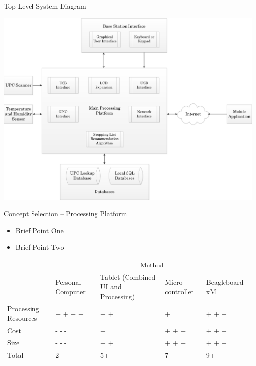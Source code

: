 \documentclass{beamer}
\begin{document}
\begin{frame}{Top Level System Diagram}
\begin{center}
\includegraphics[scale=.3]{../Graphics/FullSystemDiagram}
\end{center}
\end{frame}

\begin{frame}{Concept Selection -- Processing Platform}
\begin{itemize}
\item Brief Point One
\item Brief Point Two
\end{itemize}
\vspace{.5cm}
\footnotesize
\begin{tabular}{| p{.7in} | p{.7in} | p{1in} | p{0.7in} | p{.8in} | }
\cline{2-5}
\multicolumn{1}{c}{}&\multicolumn{4}{|c|}{Method} \\
\cline{2-5}
\multicolumn{1}{c|}{}&Personal \newline Computer&Tablet (Combined UI and Processing)&Micro-controller & Beagleboard-xM\\
\hline
Processing Resources&+ + + +&+ +&+&+ + +\\
\hline
Cost &- - -& + &+ + +&+ + +\\
\hline
Size&- - -&+ +&+ + +& + + +\\
\hline
\hline
Total &2-&5+&7+& 9+\\
\hline
\end{tabular}
\end{frame}
\end{document}
